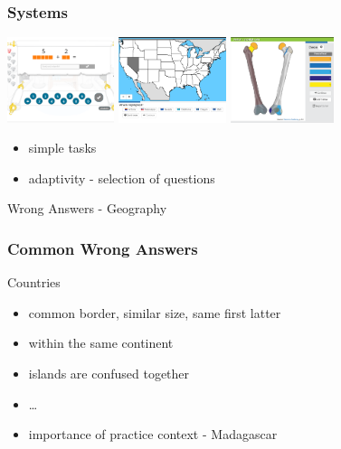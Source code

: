 \documentclass[xcolor=svgnames]{beamer}
\begin{document}
\begin{frame}
    \frametitle{Systems}
    \small
    \includegraphics[height=2.5cm]{figures/matmat.png}
    \hfill
    \includegraphics[height=2.5cm]{figures/slepemapy.png}
    \hfill
    \includegraphics[height=2.5cm]{figures/anatom.png}

    \begin{itemize}
        \item simple tasks
        \item adaptivity - selection of questions
    \end{itemize}
\end{frame}
\begin{frame}
    \centering
    \huge Wrong Answers - Geography
\end{frame}
\begin{frame}
    \frametitle{Common Wrong Answers}
    \Large
    Countries
    \begin{itemize}
        \item common border, similar size, same first latter
        \item within the same continent
        \item islands are confused together
        \item \dots
        \item importance of practice context - Madagascar
    \end{itemize}
\end{frame}
\end{document}
